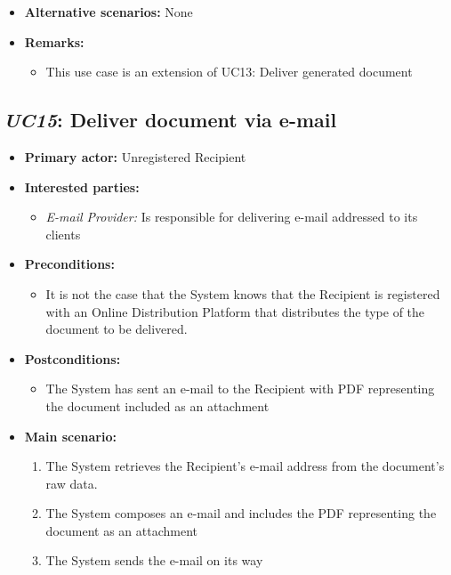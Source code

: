 \documentclass[a4paper,10pt]{article}
\begin{document}
\begin{itemize}
    \item \textbf{Alternative scenarios:} 
    None
    
    \item \textbf{Remarks:}
        \begin{itemize}
            \item This use case is an extension of UC13: Deliver generated document
        \end{itemize}
\end{itemize}

\subsection{\emph{UC15}: Deliver document via e-mail}
\begin{itemize}
    \item \textbf{Primary actor:} Unregistered Recipient
    \item \textbf{Interested parties:} 
        \begin{itemize}
            \item \textit{E-mail Provider:} Is responsible for delivering e-mail addressed to its clients
        \end{itemize}

    \item \textbf{Preconditions:}
        \begin{itemize}
            \item It is not the case that the System knows that the Recipient is registered with an Online Distribution Platform that distributes the type of the document to be delivered.
        \end{itemize}

    \item \textbf{Postconditions:}
        \begin{itemize}
            \item The System has sent an e-mail to the Recipient with PDF representing the document included as an attachment
        \end{itemize}
        
    \item \textbf{Main scenario:} 
    \begin{enumerate}
       \item The System retrieves the Recipient's e-mail address from the document's raw data.
       \item The System composes an e-mail and includes the PDF representing the document as an attachment
       \item The System sends the e-mail on its way
    \end{enumerate}


\end{itemize}
\end{document}
